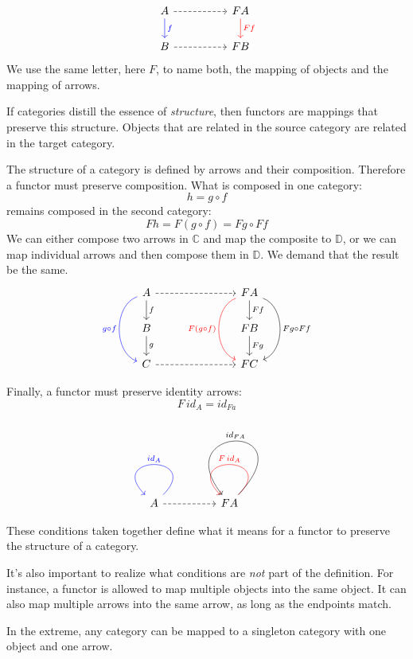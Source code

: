 \documentclass[DaoFP]{subfiles}
\begin{document}
\[
 \begin{tikzcd}
 A 
 \arrow[d, blue, "f"]
\arrow[rr, dashed]
 && F A
  \arrow[d, red, "F f"]
 \\
 B 
 \arrow[rr, dashed]
&& F B
  \end{tikzcd}
\]
We use the same letter, here $F$, to name both, the mapping of objects and the mapping of arrows. 

If categories distill the essence of \emph{structure}, then functors are mappings that preserve this structure. Objects that are related in the source category are related in the target category. 

The structure of a category is defined by arrows and their composition. Therefore a functor must preserve composition. What is composed in one category:
\[ h = g \circ f \]
remains composed in the second category:
\[ F h = F (g \circ f) = F g \circ F f \]
We can either compose two arrows in $\mathbb{C}$ and map the composite to $\mathbb{D}$, or we can map individual arrows and then compose them in $\mathbb{D}$. We demand that the result be the same.
\[
 \begin{tikzcd}
 A 
 \arrow[d, "f"]
\arrow[rrr, dashed]
\arrow[dd, bend right = 70, blue, "g \circ f"']
 &&& F A
  \arrow[d, "F f"]
  \arrow[dd, bend left = 70, "F g \circ F f"]
  \arrow[dd, bend right = 70, red, "F (g \circ f)"']
 \\
 B 
 \arrow[d, "g"]
&&& F B
 \arrow[d, "F g"]
 \\
 C
 \arrow[rrr, dashed]
&&& F C
  \end{tikzcd}
\]

Finally, a functor must preserve identity arrows:
\[ F\, id_A = id_{F a} \]

\[
 \begin{tikzcd}
 A 
  \arrow[loop, blue,  "id_A"']
\arrow[rr, dashed]
 && F A
  \arrow[loop, red, "F \, id_{A}"']
  \arrow[loop, controls={+(2.5, 2.6) and +(-2, 2.5)}, "id_{F A}"']
  \end{tikzcd}
\]

These conditions taken together define what it means for a functor to preserve the structure of a category.

It's also important to realize what conditions are \emph{not} part of the definition. For instance, a functor is allowed to map multiple objects into the same object. It can also map multiple arrows into the same arrow, as long as the endpoints match. 

In the extreme, any category can be mapped to a singleton category with one object and one arrow.
\end{document}
